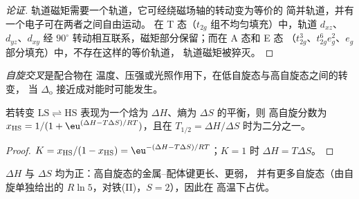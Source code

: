 \begin{proof}[论证]
轨道磁矩需要一个轨道，它可经绕磁场轴的转动变为等价的
简并轨道，并有一个电子可在两者之间自由运动。
在 T 态（$t_{2g}$ 组不均匀填充）中，轨道 $d_{xz}$、$d_{yz}$、$d_{xy}$
经 $90^\circ$ 转动相互联系，磁矩部分保留；而在 A 态和 E 态
（$t_{2g}^3$、$t_{2g}^6e_g^2$、$e_g$ 部分填充）中，不存在这样的等价轨道，
轨道磁矩被猝灭。
\end{proof}

\begin{definition}[自旋交叉]\label{def:b3:complex-spectra-magnetism:spin-crossover}
\emph{自旋交叉}是配合物在
温度、压强或光照作用下，在低自旋态与高自旋态之间的转变，
当 $\Delta_{\mathrm o}$ 接近成对能时可能发生。
\end{definition}

\begin{proposition}[交叉温度]\label{prop:b3:complex-spectra-magnetism:crossover}
若转变 $\mathrm{LS} \rightleftharpoons \mathrm{HS}$ 表现为一个焓为 $\Delta H$、熵为 $\Delta S$ 的平衡，则
高自旋分数为 $x_{\mathrm{HS}} = 1/(1 + \eu^{(\Delta H - T\Delta S)/RT})$，且在 $T_{1/2} = \Delta H/\Delta S$ 时为二分之一。
\end{proposition}

\begin{proof}
$K = x_{\mathrm{HS}}/(1 - x_{\mathrm{HS}}) = \eu^{-(\Delta H - T\Delta S)/RT}$；$K = 1$ 时 $\Delta H = T\Delta S$。
\end{proof}

$\Delta H$ 与 $\Delta S$ 均为正：高自旋态的金属–配体键更长、更弱，
并有更多自旋态（由自旋单独给出的 $R\ln5$，对铁(II)，$S = 2$），因此在
高温下占优。

